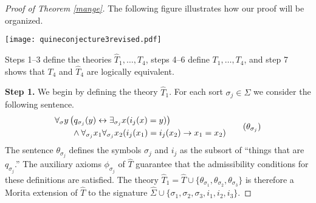 \begin{proof}[Proof of Theorem \ref{mange}]
The following figure illustrates how our proof will be organized.
\begin{center}
\texttt{[image: quineconjecture3revised.pdf]}
\end{center}
Steps 1--3 define the theories $\widehat{T}_1,\ldots, \widehat{T}_{4}$, steps 4--6 define $T_1,\ldots, T_{4}$, and step 7 shows that $T_{4}$ and $\widehat{T}_{4}$ are logically equivalent.

\textbf{Step 1.} We begin by defining the theory $\widehat{T}_1$. For each sort $\sigma_j\in\Sigma$ we consider the following sentence.
\begin{align*}
\begin{aligned}
&\forall_\sigma y \left(q_{\sigma_j}(y)\leftrightarrow \exists_{\sigma_j} x(i_j(x)=y)\right) \\ &\qquad\land \forall_{\sigma_j} x_1\forall_{\sigma_j} x_2 (i_j(x_1)=i_j(x_2)\rightarrow x_1=x_2)
\end{aligned}
\tag{$\theta_{\sigma_j}$}
\end{align*}
The sentence $\theta_{\sigma_j}$ defines the symbols $\sigma_j$ and
$i_j$ as the subsort of ``things that are $q_{\sigma_j}$.'' The
auxiliary axioms $\phi_{\sigma_j}$ of $\widehat{T}$ guarantee that the
admissibility conditions for these definitions are satisfied. The
theory
$\widehat{T}_1=\widehat{T}\cup\{\theta_{\sigma_1},
\theta_{\sigma_2},\theta_{\sigma_3}\}$ is therefore a Morita extension
of $\widehat{T}$ to the signature
$\widehat{\Sigma}\cup\{\sigma_1,\sigma_2,\sigma_3, i_1,i_2,i_3\}$.


\end{proof}
